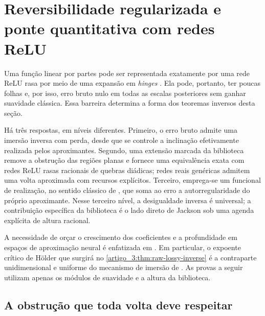 \section{Reversibilidade regularizada e ponte quantitativa com redes ReLU}
\label{artigo_3:sec:regularized-reversibility}

Uma função linear por partes pode ser representada exatamente por uma rede ReLU
rasa por meio de uma expansão em \emph{hinges}
\citep{artigo_1-devore2021,artigo_1-daubechies2022}. Ela pode, portanto, ter poucas
folhas e, por isso, erro bruto nulo em todas as escalas posteriores sem
ganhar suavidade clássica. Essa barreira determina a forma dos teoremas
inversos desta seção.

Há três respostas, em níveis diferentes. Primeiro, o erro bruto admite uma
imersão inversa com perda, desde que se controle a inclinação efetivamente
realizada pelos aproximantes. Segundo, uma extensão marcada da biblioteca
remove a obstrução das regiões planas e fornece uma equivalência exata com redes
ReLU rasas racionais de quebras diádicas; redes reais genéricas admitem uma
volta aproximada com recursos explícitos. Terceiro, emprega-se um funcional de
realização, no sentido clássico de \citet{artigo_2-hristovivanov1990}, que soma ao erro
a autorregularidade do próprio aproximante. Nesse terceiro nível, a
desigualdade inversa é universal; a contribuição específica da biblioteca é o
lado direto de Jackson sob uma agenda explícita de altura racional.

A necessidade de orçar o crescimento dos coeficientes e a profundidade em
espaços de aproximação neural é enfatizada em
\citet{artigo_2-gribonval2022,artigo_2-grohs2023,artigo_1-guhring2021}. Em particular, o expoente crítico de Hölder
que surgirá no \cref{artigo_3:thm:raw-lossy-inverse} é a contraparte unidimensional e
uniforme do mecanismo de imersão de \citet{artigo_2-grohs2023}. As provas a seguir utilizam
apenas os módulos de suavidade e a altura da biblioteca.

\subsection{A obstrução que toda volta deve respeitar}

